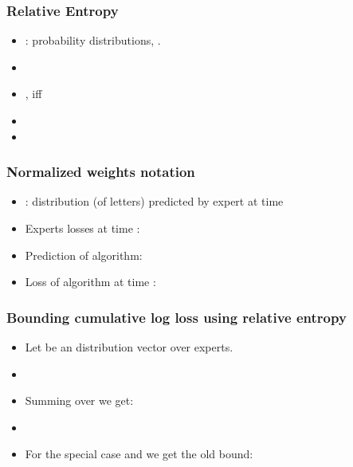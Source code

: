 \documentclass[handout]{beamer}
\begin{document}
\begin{frame}
\frametitle{Relative Entropy}
\begin{itemize}
\item \R{$\vu,\vv$}: probability distributions, 
.
\item {}
\item {},  iff 
\R{$\vu  = \vv$}
\item \R{$\exists \vu,\vv,\;\; \RE{\vu}{\vv} \neq \RE{\vv}{\vu}$}
\item {}
\end{itemize}
\end{frame}

\begin{frame}
\frametitle{Normalized weights notation}

\begin{itemize}
\item {}: distribution (of letters) predicted by expert  at time  
\item Experts losses at time :
\item Prediction of algorithm: 
\item Loss of algorithm at time :  
\end{itemize}
\end{frame}

\begin{frame}
\frametitle{Bounding cumulative log loss using relative entropy}

\begin{itemize}
\item Let \R{$\vu$} be an  distribution vector over experts.
\item {}
\item Summing over  we get:
\item
{}
\item For the special case  and  we get
  the old bound:
\end{itemize}
\end{frame}
\end{document}
